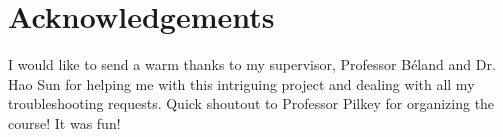 \documentclass[9pt,twocolumn,twoside]{opticajnl}
\begin{document}
\section*{Acknowledgements}
I would like to send a warm thanks to my supervisor, Professor Béland and Dr. Hao Sun for helping me with this intriguing project and dealing with all my troubleshooting requests. Quick shoutout to Professor Pilkey for organizing the course! It was fun!












\end{document}
